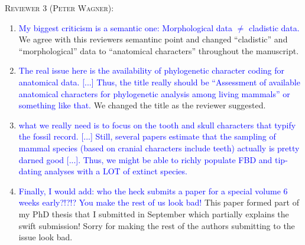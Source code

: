 \documentclass[12pt,letterpaper]{article}
\renewcommand{\section}[1]{%
\bigskip
\begin{center}
\begin{Large}
\normalfont\scshape #1
\medskip
\end{Large}
\end{center}}
\begin{document}

\section{Reviewer 3 (Peter Wagner):}
\begin{enumerate}
\item{\textcolor{blue}{My biggest criticism is a semantic one: Morphological data $\neq$ cladistic data.}}
We agree with this reviewers semantinc point and changed ``cladistic'' and ``morphological'' data to ``anatomical characters'' throughout the manuscript.

\item{\textcolor{blue}{The real issue here is the availability of phylogenetic character coding for anatomical data.
[...] Thus, the title really should be ``Assessment of available anatomical characters for phylogenetic analysis among living mammals'' or something like that.}}
We changed the title as the reviewer suggested.

\item{\textcolor{blue}{what we really need is to focus on the tooth and skull characters that typify the fossil record.
[...] Still, several papers estimate that the sampling of mammal species (based on cranial characters include teeth) actually is pretty darned good [...].
Thus, we might be able to richly populate FBD and tip-dating analyses with a LOT of extinct species.}}


\item{\textcolor{blue}{Finally, I would add: who the heck submits a paper for a special volume 6 weeks early?!?!? You make the rest of us look bad!}}
This paper formed part of my PhD thesis that I submitted in September which partially explains the swift submission!
Sorry for making the rest of the authors submitting to the issue look bad.

\end{enumerate}
\end{document}

